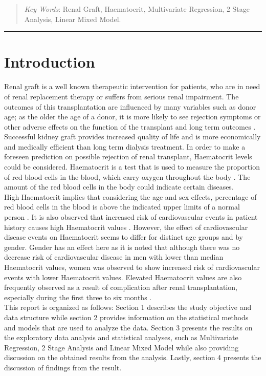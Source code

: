 \documentclass[11pt]{article}
\begin{document}
\begin{abstract}
\noindent\textit{Key Words}: Renal Graft, Haematocrit, Multivariate Regression, 2 Stage Analysis, Linear Mixed Model.

\end{abstract}
\rule{\textwidth}{0.4pt}

\section{Introduction}\label{introduction}


Renal graft is a well known therapeutic intervention for patients, who are in need of renal replacement therapy or suffers from serious renal impairment. The outcomes of this transplantation are influenced by many variables such as donor age; as the older the age of a donor, it is more likely to see rejection symptoms or other adverse effects on the function of the transplant and long term outcomes \cite{bib1}. Successful kidney graft provides increased quality of life and is more economically and medically efficient than long term dialysis treatment. In order to make a foreseen prediction on possible rejection of renal transplant, Haematocrit levels could be considered. Haematocrit is a test that is used to measure the proportion of red blood cells in the blood, which carry oxygen throughout the body \cite{bib4}. The amount of the red blood cells in the body could indicate certain diseases.\\

\noindent High Haematocrit implies that considering the age and sex effects, percentage of red blood cells in the blood is above the indicated upper limits of a normal person \cite{bib2}. It is also observed that increased risk of cardiovascular events in patient history causes high Haematocrit values \cite{bib3}. However, the effect of cardiovascular disease events on Haematocrit seems to differ for distinct age groups and by gender. Gender has an effect here as it is noted that although there was no decrease risk of cardiovascular disease in men with lower than median Haematocrit values, women was observed to show increased risk of cardiovascular events with lower Haematocrit values. Elevated Haematocrit values are also frequently observed as a result of complication after renal transplantation, especially during the first three to six months \cite{bib9}. \\

This report is organized as follows: Section 1 describes the study objective and data structure while section 2 provides information on the statistical methods and models that are used to analyze the data. Section 3 presents the results on the exploratory data analysis and statistical analyses, such as Multivariate Regression, 2 Stage Analysis and Linear Mixed Model while also providing discussion on the obtained results from the analysis. Lastly, section 4 presents the discussion of findings from the result. 
\end{document}
